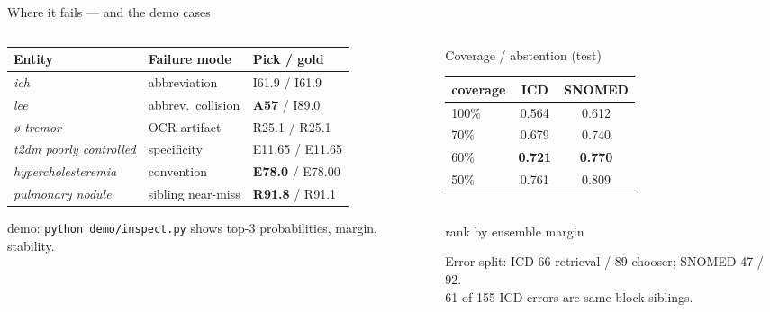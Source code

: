 \documentclass[aspectratio=169,10pt]{beamer}
\newcommand{\hl}[1]{\textcolor{accent}{\textbf{#1}}}
\newcommand{\warnt}[1]{\textcolor{warn}{\textbf{#1}}}
\begin{document}
\begin{frame}{Where it fails --- and the demo cases}
\begin{columns}[T]
\begin{column}{0.52\textwidth}
\footnotesize
\begin{tabularx}{\linewidth}{@{}lXl@{}}
\toprule
Entity & Failure mode & Pick / gold\\
\midrule
\emph{ich} & abbreviation & I61.9 / I61.9\\
\emph{lee} & abbrev.\ collision & \warnt{A57} / I89.0\\
\emph{\o{} tremor} & OCR artifact & R25.1 / R25.1\\
\emph{t2dm poorly controlled} & specificity & E11.65 / E11.65\\
\emph{hypercholesteremia} & convention & \warnt{E78.0} / E78.00\\
\emph{pulmonary nodule} & sibling near-miss & \warnt{R91.8} / R91.1\\
\bottomrule
\end{tabularx}
\vspace{2mm}

{\footnotesize demo: \texttt{python demo/inspect.py} shows top-3 probabilities, margin, stability.}
\end{column}
\begin{column}{0.44\textwidth}
\begin{block}{Coverage / abstention (test)}
\small
\begin{tabular}{@{}lcc@{}}
\toprule
coverage & ICD & SNOMED\\
\midrule
100\% & 0.564 & 0.612\\
70\% & 0.679 & 0.740\\
60\% & \hl{0.721} & \hl{0.770}\\
50\% & 0.761 & 0.809\\
\bottomrule
\end{tabular}\\[1mm]
{\footnotesize rank by ensemble margin}
\end{block}
\vspace{2mm}
{\small Error split: ICD 66 retrieval / 89 chooser; SNOMED 47 / 92.\\[1pt]
61 of 155 ICD errors are same-block siblings.}
\end{column}
\end{columns}
\end{frame}
\end{document}
